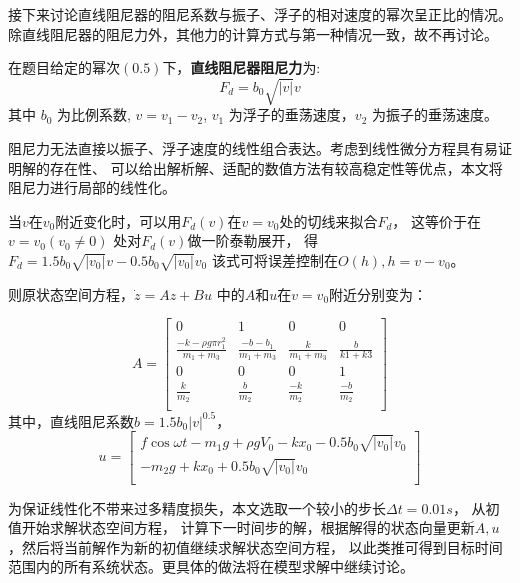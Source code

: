 \documentclass[withoutpreface,bwprint]{cumcmthesis} %
\begin{document}
    接下来讨论直线阻尼器的阻尼系数与振子、浮子的相对速度的幂次呈正比的情况。\\
    除直线阻尼器的阻尼力外，其他力的计算方式与第一种情况一致，故不再讨论。

    在题目给定的幂次$(0.5)$下，\textbf{直线阻尼器阻尼力}为:
    \begin{equation}
        F_d = b_0 \sqrt{|v|}v
        \label{eq:d_1}
    \end{equation} 其中 $b_0$ 为比例系数, $v = v_1 - v_2$, $v_1$ 为浮子的垂荡速度，$v_2$ 为振子的垂荡速度。

    阻尼力无法直接以振子、浮子速度的线性组合表达。考虑到线性微分方程具有易证明解的存在性、
    可以给出解析解、适配的数值方法有较高稳定性等优点，本文将阻尼力进行局部的线性化。

    当$v$在$v_0$附近变化时，可以用$F_d(v)$在$v=v_0$处的切线来拟合$F_d$，
    这等价于在$v = v_0(v_0 \neq 0)$ 处对$F_d(v)$做一阶泰勒展开，
    得$ F_d = 1.5 b_0 \sqrt{|v_0|}v - 0.5 b_0\sqrt{|v_0|}v_0$
    该式可将误差控制在$O(h),h = v - v_0 $。

    则原状态空间方程，$ \dot{z}= Az + Bu$ 中的$ A $和$ u $在$ v = v_0 $附近分别变为：

    $$
    A = \left [
        \begin{array}{cccc}
            0&1&0&0 \\
            \frac{-k -\rho g \pi r_1^2}{m_1 + m_3} & \frac{-b - b_1}{m_1 + m_3}
            & \frac{k}{m_1 + m_3} & \frac{b}{k1 + k3}\\
            0&0&0&1 \\
            \frac{k}{m_2}& \frac{b}{m_2} & \frac{-k}{m_2} & \frac{-b}{m_2}\\
        \end{array} \right ]
    $$
    其中，直线阻尼系数$b = 1.5 b_0 |v|^{0.5}$，
    $$
    u = \left [
        \begin{array}{c}
            f\cos \omega t - m_1 g + \rho g V_0 - k x_0 -  0.5 b_0\sqrt{|v_0|}v_0\\
            -m_2 g + k x_0 + 0.5 b_0\sqrt{|v_0|}v_0 \\
        \end{array} \right ]
    $$

    为保证线性化不带来过多精度损失，本文选取一个较小的步长$ \Delta t = 0.01s$， 从初值开始求解状态空间方程，
    计算下一时间步的解，根据解得的状态向量更新$ A, u $，然后将当前解作为新的初值继续求解状态空间方程，
    以此类推可得到目标时间范围内的所有系统状态。更具体的做法将在模型求解中继续讨论。
\end{document}
